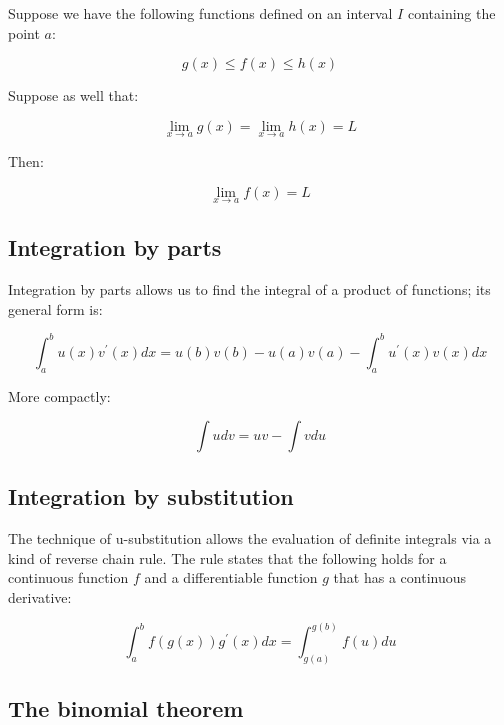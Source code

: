 \documentclass{report}
\begin{document}
Suppose we have the following functions defined on an interval $I$ containing the point $a$:

\begin{equation}\label{eq:squeez-assumption-1}
    g(x) \le f(x) \le h(x)
\end{equation}

Suppose as well that:

\begin{equation}\label{eq:squeeze-assumption-2}
    \lim_{x\to a} g(x) = \lim_{x\to a} h(x) = L
\end{equation}

Then:

\begin{equation}\label{eq:squeeze}
    \lim_{x\to a} f(x) = L
\end{equation}

\subsection{Integration by parts}

Integration by parts allows us to find the integral of a product of functions; its general form is:

\begin{equation}\label{eq:integral-by-parts-general}
    \int_a^b u(x) v^\prime(x) dx = u(b)v(b) - u(a)v(a) - \int_a^b u^\prime(x) v(x) dx
\end{equation}

More compactly:

\begin{equation}\label{eq:integral-by-parts-simple}
   \int u dv = uv - \int v du 
\end{equation}

\subsection{Integration by substitution}

The technique of u-substitution allows the evaluation of definite integrals via a kind of reverse chain rule. The rule states that the following holds for a continuous function $f$ and a differentiable function $g$ that has a continuous derivative:

\begin{equation}\label{eq:integral-by-sub}
    \int_a^b f(g(x))g^\prime(x) dx = \int_{g(a)}^{g(b)} f(u) du
\end{equation}

\subsection{The binomial theorem}
\end{document}
